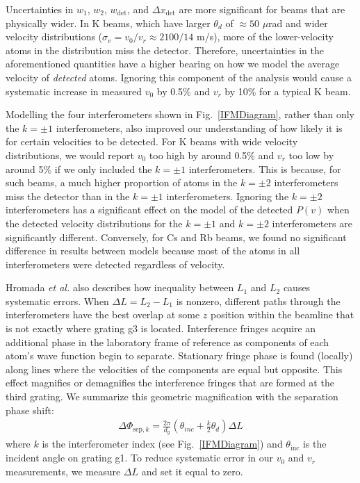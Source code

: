 \documentclass[twocolumn,prl,showpacs,superscriptaddress]{revtex4-1}   %
\newcommand{\figref}[1]{Fig.~\ref{#1}}
\newcommand{\dphisepk}{\Delta\Phi_{\mathrm{sep},k}}
\newcommand{\etalspace}{\textit{et al. }}
\begin{document}
Uncertainties in $w_1$, $w_2$, $w_{\mathrm{det}}$, and $\Delta x_{\mathrm{det}}$ are more significant for beams that are physically wider. 
In K beams, which have larger $\theta_d$ of $\approx 50$ $\mu$rad and wider velocity distributions ($\sigma_v = v_0/v_r \approx 2100/14$ m/s), more of the lower-velocity atoms in the distribution miss the detector. Therefore, uncertainties in the aforementioned quantities have a higher bearing on how we model the average velocity of \textit{detected} atoms.
Ignoring this component of the analysis would cause a systematic increase in measured $v_0$ by 0.5\% and $v_r$ by 10\% for a typical K beam.

Modelling the four interferometers shown in \figref{IFMDiagram}, rather than only the $k=\pm1$ interferometers, also improved our understanding of how likely it is for certain velocities to be detected. For K beams with wide velocity distributions, 
we would report $v_0$ too high by around 0.5\% and $v_r$ too low by around 5\% if we only included the $k=\pm 1$ interferometers.
This is because, for such beams, a much higher proportion of atoms in the $k=\pm2$ interferometers miss the detector than in the $k=\pm1$ interferometers. 
Ignoring the $k=\pm 2$ interferometers has a significant effect on the model of the detected $P(v)$ when the detected velocity distributions for the $k=\pm1$ and $k=\pm2$ interferometers are significantly different.
Conversely, for Cs and Rb beams, we found no significant difference in results between models because most of the atoms in all interferometers were detected regardless of velocity.

Hromada \etalspace \cite{Hromada2014} also describes how inequality between $L_1$ and $L_2$ causes systematic errors. 
When $\Delta L = L_2 - L_1$ is nonzero, different paths through the interferometers have the best overlap at some $z$ position within the beamline that is not exactly where grating g3 is located. 
Interference fringes acquire an additional phase in the laboratory frame of reference as components of each atom's wave function begin to separate. Stationary fringe phase is found (locally) along lines where the velocities of the components are equal but opposite.
This effect magnifies or demagnifies the interference fringes that are formed at the third grating. We summarize this geometric magnification with the separation phase shift:
\begin{align}
	\dphisepk = \frac{2\pi}{d_g}
	\left(
		\theta_{inc} + \frac{k}{2}\theta_d
	\right) \Delta L
	\label{phiSep}
\end{align}
where $k$ is the interferometer index (see \figref{IFMDiagram}) and $\theta_{\mathrm{inc}}$ is the incident angle on grating g1. 
To reduce systematic error in our $v_0$ and $v_r$ measurements, 
we measure $\Delta L$ and set it equal to zero.
\end{document}
